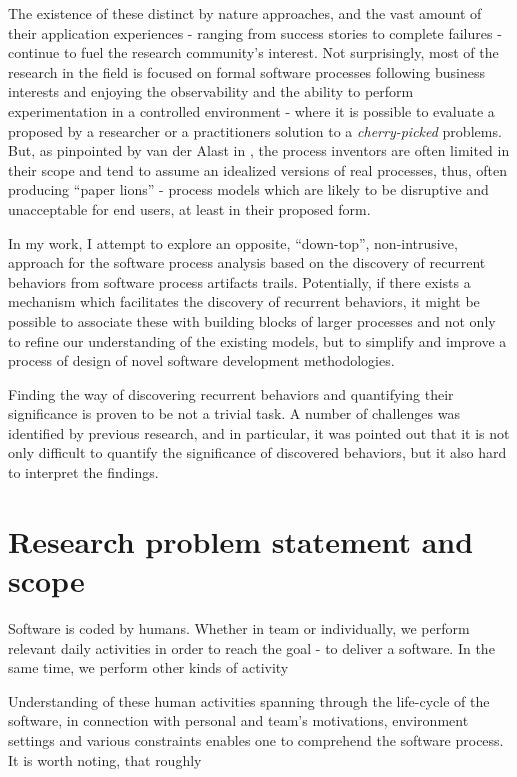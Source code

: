 The existence of these distinct by nature approaches, and the vast amount of their application experiences -
ranging from success stories to complete failures - continue to fuel the research community's interest. 
Not surprisingly, most of the research in the field is focused on formal software processes following business 
interests and enjoying the observability and the ability to perform experimentation in a controlled environment -
where it is possible to evaluate a proposed by a researcher or a practitioners solution to a \textit{cherry-picked}
problems. 
But, as pinpointed by van der Alast in \cite{citeulike:9758924}, the process inventors are often limited in their
scope and tend to assume an idealized versions of real processes, thus, often producing ``paper lions'' - 
process models which are likely to be disruptive and unacceptable for end users, at least in their proposed form.

In my work, I attempt to explore an opposite, ``down-top'', non-intrusive, approach for the software 
process analysis based on the discovery of recurrent behaviors from software process artifacts trails. 
Potentially, if there exists a mechanism which facilitates the discovery of recurrent behaviors, 
it might be possible to associate these with building blocks of larger processes and not only to 
refine our understanding of the existing models, but to simplify and improve a process of design of 
novel software development methodologies.

Finding the way of discovering recurrent behaviors and quantifying their significance is proven to be 
not a trivial task. A number of challenges was identified by previous research, and in particular, it
was pointed out that it is not only difficult to quantify the significance of discovered behaviors, 
but it also hard to interpret the findings. 

\section{Research problem statement and scope}
Software is coded by humans. Whether in team or individually, we perform relevant daily activities 
in order to reach the goal - to deliver a software. In the same time, we perform other kinds of activity

Understanding of these human activities spanning through the life-cycle of the software, 
in connection with personal and team's motivations, environment settings and various constraints enables one to
comprehend the software process. It is worth noting, that roughly 


